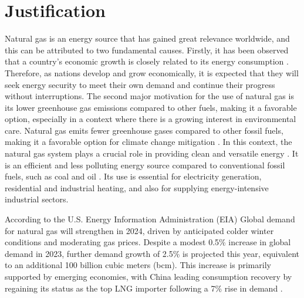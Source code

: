 

\section{Justification}

Natural gas is an energy source that has gained great relevance worldwide, and this can be attributed to two fundamental causes. Firstly, it has been observed that a country's economic growth is closely related to its energy consumption \cite{Alam_M}. Therefore, as nations develop and grow economically, it is expected that they will seek energy security to meet their own demand and continue their progress without interruptions. The second major motivation for the use of natural gas is its lower greenhouse gas emissions compared to other fuels, making it a favorable option, especially in a context where there is a growing interest in environmental care. Natural gas emits fewer greenhouse gases compared to other fossil fuels, making it a favorable option for climate change mitigation \cite{china_natural_gas}. In this context, the natural gas system plays a crucial role in providing clean and versatile energy \cite{Yin_Wen_Wu_Han_Mukhtar_Gong_2022}. It is an efficient and less polluting energy source compared to conventional fossil fuels, such as coal and oil \cite{Aydin_2018}. Its use is essential for electricity generation, residential and industrial heating, and also for supplying energy-intensive industrial sectors.

According to the U.S. Energy Information Administration (EIA) Global demand for natural gas will strengthen in 2024, driven by anticipated colder winter conditions and moderating gas prices. Despite a modest 0.5\% increase in global demand in 2023, further demand growth of 2.5\% is projected this year, equivalent to an additional 100 billion cubic meters (bcm). This increase is primarily supported by emerging economies, with China leading consumption recovery by regaining its status as the top LNG importer following a 7\% rise in demand \cite{IEA_2024}. 




